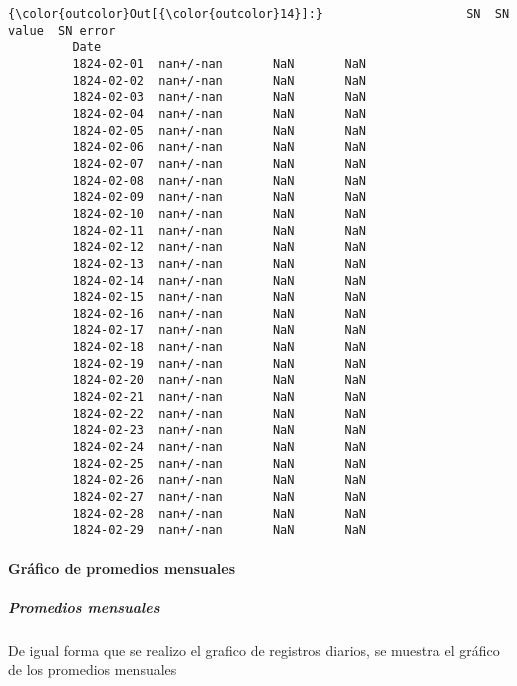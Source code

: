 \documentclass[11pt]{article}
\begin{document}
\begin{Verbatim}[commandchars=\\\{\}]
{\color{outcolor}Out[{\color{outcolor}14}]:}                    SN  SN value  SN error
         Date                                     
         1824-02-01  nan+/-nan       NaN       NaN
         1824-02-02  nan+/-nan       NaN       NaN
         1824-02-03  nan+/-nan       NaN       NaN
         1824-02-04  nan+/-nan       NaN       NaN
         1824-02-05  nan+/-nan       NaN       NaN
         1824-02-06  nan+/-nan       NaN       NaN
         1824-02-07  nan+/-nan       NaN       NaN
         1824-02-08  nan+/-nan       NaN       NaN
         1824-02-09  nan+/-nan       NaN       NaN
         1824-02-10  nan+/-nan       NaN       NaN
         1824-02-11  nan+/-nan       NaN       NaN
         1824-02-12  nan+/-nan       NaN       NaN
         1824-02-13  nan+/-nan       NaN       NaN
         1824-02-14  nan+/-nan       NaN       NaN
         1824-02-15  nan+/-nan       NaN       NaN
         1824-02-16  nan+/-nan       NaN       NaN
         1824-02-17  nan+/-nan       NaN       NaN
         1824-02-18  nan+/-nan       NaN       NaN
         1824-02-19  nan+/-nan       NaN       NaN
         1824-02-20  nan+/-nan       NaN       NaN
         1824-02-21  nan+/-nan       NaN       NaN
         1824-02-22  nan+/-nan       NaN       NaN
         1824-02-23  nan+/-nan       NaN       NaN
         1824-02-24  nan+/-nan       NaN       NaN
         1824-02-25  nan+/-nan       NaN       NaN
         1824-02-26  nan+/-nan       NaN       NaN
         1824-02-27  nan+/-nan       NaN       NaN
         1824-02-28  nan+/-nan       NaN       NaN
         1824-02-29  nan+/-nan       NaN       NaN
\end{Verbatim}
            
    \hypertarget{gruxe1fico-de-promedios-mensuales}{%
\paragraph{Gráfico de promedios
mensuales}\label{gruxe1fico-de-promedios-mensuales}}

    \hypertarget{promedios-mensuales}{%
\subparagraph{\texorpdfstring{\textbf{Promedios
mensuales}}{Promedios mensuales}}\label{promedios-mensuales}}

    De igual forma que se realizo el grafico de registros diarios, se
muestra el gráfico de los promedios mensuales
\end{document}
